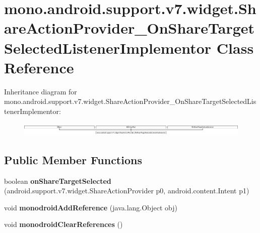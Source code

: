 \hypertarget{classmono_1_1android_1_1support_1_1v7_1_1widget_1_1_share_action_provider___on_share_target_selected_listener_implementor}{}\section{mono.\+android.\+support.\+v7.\+widget.\+Share\+Action\+Provider\+\_\+\+On\+Share\+Target\+Selected\+Listener\+Implementor Class Reference}
\label{classmono_1_1android_1_1support_1_1v7_1_1widget_1_1_share_action_provider___on_share_target_selected_listener_implementor}
Inheritance diagram for mono.\+android.\+support.\+v7.\+widget.\+Share\+Action\+Provider\+\_\+\+On\+Share\+Target\+Selected\+Listener\+Implementor\+:\begin{figure}[H]
\begin{center}
\leavevmode
\includegraphics[height=0.644790cm]{classmono_1_1android_1_1support_1_1v7_1_1widget_1_1_share_action_provider___on_share_target_selected_listener_implementor}
\end{center}
\end{figure}
\subsection*{Public Member Functions}
\begin{DoxyCompactItemize}
\item 
\mbox{\label{classmono_1_1android_1_1support_1_1v7_1_1widget_1_1_share_action_provider___on_share_target_selected_listener_implementor_acd158ea7fad91d537c19f92888995fad}} 
boolean {\bfseries on\+Share\+Target\+Selected} (android.\+support.\+v7.\+widget.\+Share\+Action\+Provider p0, android.\+content.\+Intent p1)
\item 
\mbox{\label{classmono_1_1android_1_1support_1_1v7_1_1widget_1_1_share_action_provider___on_share_target_selected_listener_implementor_a56c3e72e0afae02044279e72744f2c14}} 
void {\bfseries monodroid\+Add\+Reference} (java.\+lang.\+Object obj)
\item 
\mbox{\label{classmono_1_1android_1_1support_1_1v7_1_1widget_1_1_share_action_provider___on_share_target_selected_listener_implementor_a6365fd94f326b807c545489837189d68}} 
void {\bfseries monodroid\+Clear\+References} ()
\end{DoxyCompactItemize}
